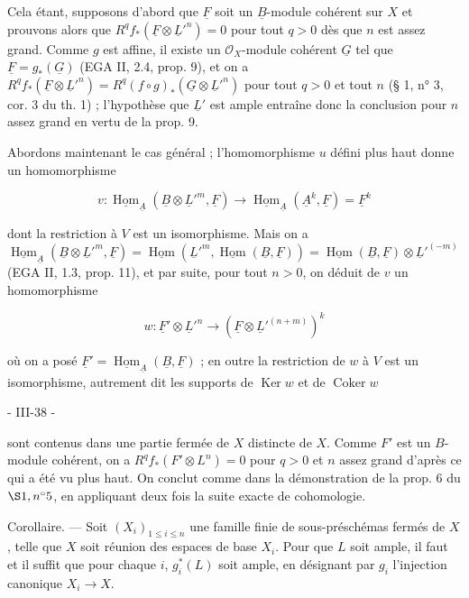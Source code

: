 Cela étant, supposons d'abord que $\underline{F}$ soit un $\underline{B}$-module cohérent sur $X$ et prouvons alors que $R^q f_* (\underline{F} \otimes \underline{L}'^n) = 0$ pour tout $q > 0$ dès que $n$ est assez grand. Comme $g$ est affine, il existe un $\mathcal{O}_X$-module cohérent $\underline{G}$ tel que $\underline{F} = g_*(\underline{G})$ (EGA II, 2.4, prop. 9), et on a $R^q f_* (\underline{F} \otimes \underline{L}'^n) = R^q (f \circ g)_* (\underline{G} \otimes \underline{L}'^n)$ pour tout $q > 0$ et tout $n$ (§ 1, n° 3, cor. 3 du th. 1) ; l'hypothèse que $\underline{L}'$ est ample entraîne donc la conclusion pour $n$ assez grand en vertu de la prop. 9.

Abordons maintenant le cas général ; l'homomorphisme $u$ défini plus haut donne un homomorphisme

$$v : \underline{\operatorname{Hom}}_{\underline{A}}(\underline{B} \otimes \underline{L}'^m, \underline{F}) \to \underline{\operatorname{Hom}}_{\underline{A}}(\underline{A}^k, \underline{F}) = \underline{F}^k$$

dont la restriction à $V$ est un isomorphisme. Mais on a
$\underline{\operatorname{Hom}}_{\underline{A}}(\underline{B} \otimes \underline{L}'^m, \underline{F}) = \underline{\operatorname{Hom}}(\underline{L}'^m, \underline{\operatorname{Hom}}(\underline{B}, \underline{F})) = \underline{\operatorname{Hom}}(\underline{B}, \underline{F}) \otimes \underline{L}'^{(-m)}$
(EGA II, 1.3, prop. 11), et par suite, pour tout $n > 0$, on déduit de $v$ un homomorphisme

$$w : \underline{F}' \otimes \underline{L}'^n \to (\underline{F} \otimes \underline{L}'^{(n+m)})^k$$

où on a posé $\underline{F}' = \underline{\operatorname{Hom}}_{\underline{A}}(\underline{B}, \underline{F})$ ; en outre la restriction de $w$ à $V$ est un isomorphisme, autrement dit les supports de $\operatorname{Ker} w$ et de $\operatorname{Coker} w$

\newpage


- III-38 -

sont contenus dans une partie fermée de $X$ distincte de $X$. Comme $F'$ est un $B$-module cohérent, on a $R^q f_* (F' \otimes L^n) = 0$ pour $q > 0$ et $n$ assez grand d'après ce qui a été vu plus haut. On conclut comme dans la démonstration de la prop. 6 du $\S 1, n^\circ 5$, en appliquant deux fois la suite exacte de cohomologie.

Corollaire. — Soit $(X_i)_{1 \leq i \leq n}$ une famille finie de sous-préschémas fermés de $X$, telle que $X$ soit réunion des espaces de base $X_i$. Pour que $L$ soit ample, il faut et il suffit que pour chaque $i$, $g_i^*(L)$ soit ample, en désignant par $g_i$ l'injection canonique $X_i \to X$.

